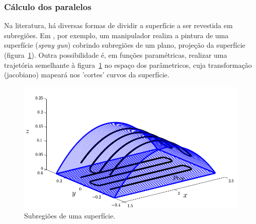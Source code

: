\subsubsection{Cálculo dos paralelos}
Na literatura, há diversas formas de dividir a superfície a ser revestida em
subregiões. Em \cite{from2010off}, por exemplo, um manipulador realiza a pintura
de uma superfície (\textit{spray gun}) cobrindo subregiões de um plano, projeção
da superfície (figura~\ref{fig::pal}). Outra possibilidade é, em funções
paramétricas, realizar uma trajetória semelhante à figura~\ref{fig::pal} no
espaço dos parâmetricos, cuja transformação (jacobiano) mapeará nos 'cortes' curvos da
superfície.

\begin{figure}[!ht]
	\centering	
	\includegraphics[width=\columnwidth]{figs/planejamento/pal.png}
	\caption{Subregiões de uma superfície.}
	\label{fig::pal}
\end{figure}


